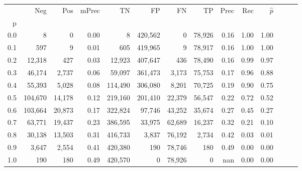 \begin{tabular}{rrrrrrrrrrrrrr}
\toprule
{} &      Neg &     Pos & mPrec &       TN &       FP &      FN &      TP &  Prec &   Rec & $\hat{p}$ \\
p   &          &         &       &          &          &         &         &       &       &           \\
\midrule
0.0 &        8 &       0 &  0.00 &        8 &  420,562 &       0 &  78,926 &  0.16 &  1.00 &      1.00 \\
0.1 &      597 &       9 &  0.01 &      605 &  419,965 &       9 &  78,917 &  0.16 &  1.00 &      1.00 \\
0.2 &   12,318 &     427 &  0.03 &   12,923 &  407,647 &     436 &  78,490 &  0.16 &  0.99 &      0.97 \\
0.3 &   46,174 &   2,737 &  0.06 &   59,097 &  361,473 &   3,173 &  75,753 &  0.17 &  0.96 &      0.88 \\
0.4 &   55,393 &   5,028 &  0.08 &  114,490 &  306,080 &   8,201 &  70,725 &  0.19 &  0.90 &      0.75 \\
0.5 &  104,670 &  14,178 &  0.12 &  219,160 &  201,410 &  22,379 &  56,547 &  0.22 &  0.72 &      0.52 \\
0.6 &  103,664 &  20,873 &  0.17 &  322,824 &   97,746 &  43,252 &  35,674 &  0.27 &  0.45 &      0.27 \\
0.7 &   63,771 &  19,437 &  0.23 &  386,595 &   33,975 &  62,689 &  16,237 &  0.32 &  0.21 &      0.10 \\
0.8 &   30,138 &  13,503 &  0.31 &  416,733 &    3,837 &  76,192 &   2,734 &  0.42 &  0.03 &      0.01 \\
0.9 &    3,647 &   2,554 &  0.41 &  420,380 &      190 &  78,746 &     180 &  0.49 &  0.00 &      0.00 \\
1.0 &      190 &     180 &  0.49 &  420,570 &        0 &  78,926 &       0 &   nan &  0.00 &      0.00 \\
\bottomrule
\end{tabular}
